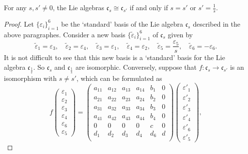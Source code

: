 \documentclass[10pt,a4paper]{amsart}
\begin{document}
\begin{lemma}
For any $s,s'\neq0$, the Lie algebras ${\mathfrak c}_s \cong {\mathfrak c}_{s'}$ if and only if $s=s'$ or $s'=\frac{1}{s}$.
\end{lemma}

\begin{proof}
Let $\{\varepsilon_i\}_{i=1}^6$ be the `standard' basis of the Lie algebra $\mathfrak{c}_s$ described in the above paragraphes. Consider a new basis $\{\tilde{\varepsilon}_i\}_{i=1}^6$ of $\mathfrak{c}_s$ given by
\[\tilde{\varepsilon}_1=\varepsilon_3,\quad \tilde{\varepsilon}_2=\varepsilon_4,\quad \tilde{\varepsilon}_3=\varepsilon_1,\quad \tilde{\varepsilon}_4=\varepsilon_2,\quad
\tilde{\varepsilon}_5=\frac{\varepsilon_5}{s},\quad \tilde{\varepsilon}_6=-\varepsilon_6.\]
It is not difficult to see that this new basis is a `standard' basis for the Lie algebra $\mathfrak{c}_{\frac{1}{s}}$. So ${\mathfrak c}_s$ and $\mathfrak{c}_{\frac{1}{s}}$ are isomorphic.
Conversely, suppose that $f:{\mathfrak c}_s \rightarrow {\mathfrak c}_{s'}$ is an isomorphism with $s \neq s'$, which can be formulated as
\[f\begin{pmatrix} \varepsilon_1 \\ \varepsilon_2 \\ \varepsilon_3 \\ \varepsilon_4 \\ \varepsilon_6 \\ \varepsilon_5 \end{pmatrix}
=\begin{pmatrix} a_{11} & a_{12} & a_{13} & a_{14} & b_1 & 0\\
                 a_{21} & a_{22} & a_{23} & a_{24} & b_2 & 0\\
                 a_{31} & a_{32} & a_{33} & a_{34} & b_3 & 0\\
                 a_{41} & a_{42} & a_{43} & a_{44} & b_4 & 0\\
                    0    &     0   &     0   &     0   &  c  & 0 \\
                 d_{1}  & d_{2}  & d_{3}  & d_{4}  & d_6 & d\\
                 \end{pmatrix}
\begin{pmatrix} \varepsilon'_1 \\ \varepsilon'_2 \\ \varepsilon'_3 \\ \varepsilon'_4 \\ \varepsilon'_6 \\ \varepsilon'_5 \end{pmatrix},\]

\end{proof}
\end{document}
